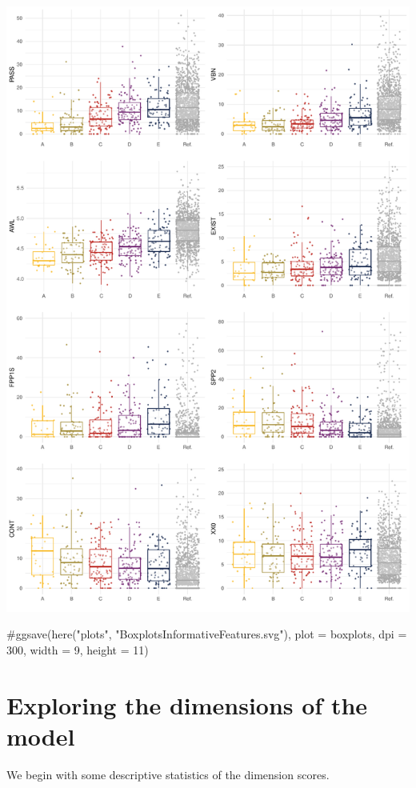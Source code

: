 \documentclass[
  letterpaper,
  DIV=11,
  numbers=noendperiod]{scrreprt}
\newenvironment{Shaded}{\begin{snugshade}}{\end{snugshade}}
\newcommand{\CommentTok}[1]{\textcolor[rgb]{0.37,0.37,0.37}{#1}}
\begin{document}
\includegraphics{G_Ch7_Analysis_files/figure-pdf/boxplots-1.pdf}

\begin{Shaded}
\begin{Highlighting}[]
\CommentTok{\#ggsave(here("plots", "BoxplotsInformativeFeatures.svg"), plot = boxplots, dpi = 300, width = 9, height = 11)}
\end{Highlighting}
\end{Shaded}

\section{Exploring the dimensions of the
model}\label{exploring-the-dimensions-of-the-model-1}

We begin with some descriptive statistics of the dimension scores.
\end{document}
